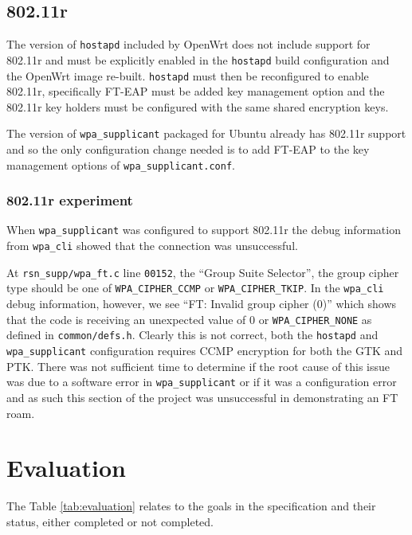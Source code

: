 \documentclass[pdftex, 12pt, a4paper]{article}
\begin{document}

\subsection{802.11r}

The version of \verb`hostapd` included by OpenWrt does not include support for 802.11r and must be explicitly enabled in the \verb`hostapd` build configuration and the OpenWrt image re-built.  \verb`hostapd` must then be reconfigured to enable 802.11r, specifically FT-EAP must be added key management option and the 802.11r key holders must be configured with the same shared encryption keys.

The version of \verb`wpa_supplicant` packaged for Ubuntu already has 802.11r support and so the only configuration change needed is to add FT-EAP to the key management options of \verb`wpa_supplicant.conf`.

\subsubsection{802.11r experiment}
When \verb`wpa_supplicant` was configured to support 802.11r the debug information from \verb`wpa_cli` showed that the connection was unsuccessful.

At \verb`rsn_supp/wpa_ft.c` line \verb`00152`, the ``Group Suite Selector'', the group cipher type should be one of \verb`WPA_CIPHER_CCMP` or \verb`WPA_CIPHER_TKIP`.  In the \verb`wpa_cli` debug information, however, we see ``FT: Invalid group cipher (0)'' which shows that the code is receiving an unexpected value of 0 or \verb`WPA_CIPHER_NONE` as defined in \verb`common/defs.h`.  Clearly this is not correct, both the \verb`hostapd` and \verb`wpa_supplicant` configuration requires CCMP encryption for both the GTK and PTK. There was not sufficient time to determine if the root cause of this issue was due to a software error in \verb`wpa_supplicant` or if it was a configuration error and as such this section of the project was unsuccessful in demonstrating an FT roam.

\section{Evaluation}
The Table \ref{tab:evaluation} relates to the goals in the specification and their status, either completed or not completed.
\end{document}
